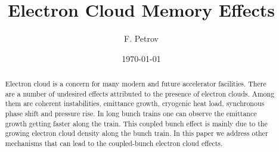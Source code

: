 \documentclass[1p]{elsarticle}%
\begin{document}
\title{Electron Cloud Memory Effects}
\author{F. Petrov}
\address[tudtemf]{Institut f\"ur Theorie Elektromagnetischer Felder (TEMF), Technische Universit\"{a}t Darmstadt,
Schlo{\ss}gartenstr. 8 64289 Darmstadt}
\date{\today}
\begin{abstract}
Electron cloud is a concern for many modern and future accelerator facilities. There are a number of undesired effects attributed to the presence of electron clouds. Among them are coherent instabilities, emittance growth, cryogenic heat load, synchronous phase shift and pressure rise. In long bunch trains one can observe the emittance growth getting faster along the train. This coupled bunch effect is mainly due to the growing electron cloud density along the bunch train. In this paper we address other mechanisms that can lead to the coupled-bunch electron cloud effects.
\end{abstract}


\maketitle
\end{document}

